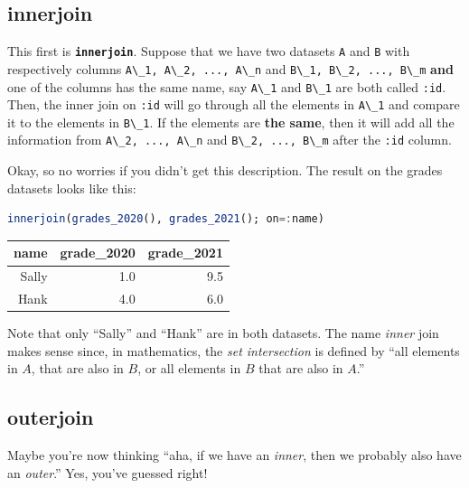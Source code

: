 \documentclass[
  notoc %
]{tufte-book}
\newcommand{\passthrough}[1]{#1}
\begin{document}
\hypertarget{sec:innerjoin}{%
\subsection{innerjoin}\label{sec:innerjoin}}

This first is \textbf{\passthrough{\lstinline!innerjoin!}}. Suppose that
we have two datasets \passthrough{\lstinline!A!} and
\passthrough{\lstinline!B!} with respectively columns
\passthrough{\lstinline!A\_1, A\_2, ..., A\_n!} and
\passthrough{\lstinline!B\_1, B\_2, ..., B\_m!} \textbf{and} one of the
columns has the same name, say \passthrough{\lstinline!A\_1!} and
\passthrough{\lstinline!B\_1!} are both called
\passthrough{\lstinline!:id!}. Then, the inner join on
\passthrough{\lstinline!:id!} will go through all the elements in
\passthrough{\lstinline!A\_1!} and compare it to the elements in
\passthrough{\lstinline!B\_1!}. If the elements are \textbf{the same},
then it will add all the information from
\passthrough{\lstinline!A\_2, ..., A\_n!} and
\passthrough{\lstinline!B\_2, ..., B\_m!} after the
\passthrough{\lstinline!:id!} column.

Okay, so no worries if you didn't get this description. The result on
the grades datasets looks like this:

\begin{lstlisting}[language=Julia]
innerjoin(grades_2020(), grades_2021(); on=:name)
\end{lstlisting}

\begin{longtable}[]{@{}rrr@{}}
\toprule
name & grade\_2020 & grade\_2021 \\
\midrule
\endhead
Sally & 1.0 & 9.5 \\
Hank & 4.0 & 6.0 \\
\bottomrule
\end{longtable}

Note that only ``Sally'' and ``Hank'' are in both datasets. The name
\emph{inner} join makes sense since, in mathematics, the \emph{set
intersection} is defined by ``all elements in \(A\), that are also in
\(B\), or all elements in \(B\) that are also in \(A\).''

\hypertarget{sec:outerjoin}{%
\subsection{outerjoin}\label{sec:outerjoin}}

Maybe you're now thinking ``aha, if we have an \emph{inner}, then we
probably also have an \emph{outer}.'' Yes, you've guessed right!
\end{document}
